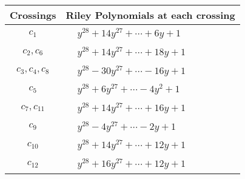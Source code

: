 \documentclass[1p]{elsarticle_modified}
\theoremstyle{definition}
\begin{document}
\begin{tabular}{m{50pt}|m{274pt}}
Crossings & \hspace{64pt}Riley Polynomials at each crossing \\
\hline $$\begin{aligned}c_{1}\end{aligned}$$&$\begin{aligned}
&y^{28}+14 y^{27}+\cdots+6 y+1
\end{aligned}$\\
\hline $$\begin{aligned}c_{2},c_{6}\end{aligned}$$&$\begin{aligned}
&y^{28}+14 y^{27}+\cdots+18 y+1
\end{aligned}$\\
\hline $$\begin{aligned}c_{3},c_{4},c_{8}\end{aligned}$$&$\begin{aligned}
&y^{28}-30 y^{27}+\cdots-16 y+1
\end{aligned}$\\
\hline $$\begin{aligned}c_{5}\end{aligned}$$&$\begin{aligned}
&y^{28}+6 y^{27}+\cdots-4 y^2+1
\end{aligned}$\\
\hline $$\begin{aligned}c_{7},c_{11}\end{aligned}$$&$\begin{aligned}
&y^{28}+14 y^{27}+\cdots+16 y+1
\end{aligned}$\\
\hline $$\begin{aligned}c_{9}\end{aligned}$$&$\begin{aligned}
&y^{28}-4 y^{27}+\cdots-2 y+1
\end{aligned}$\\
\hline $$\begin{aligned}c_{10}\end{aligned}$$&$\begin{aligned}
&y^{28}+14 y^{27}+\cdots+12 y+1
\end{aligned}$\\
\hline $$\begin{aligned}c_{12}\end{aligned}$$&$\begin{aligned}
&y^{28}+16 y^{27}+\cdots+12 y+1
\end{aligned}$\\
\hline
\end{tabular}\\~\\
\end{document}
